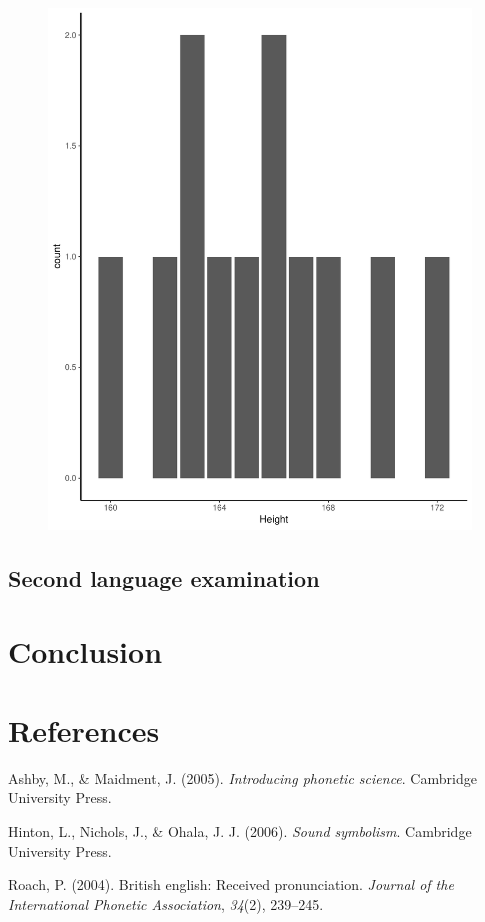 \documentclass[man, fleqn, noextraspace]{apa6}
\begin{document}
\begin{figure}
\centering
\includegraphics{Vowel_v2_files/figure-latex/figure6-1.pdf}
\caption{}
\end{figure}

\subsection{Second language
examination}\label{second-language-examination}

\section{Conclusion}\label{conclusion}

\newpage

\section{References}\label{references}

\begingroup
\setlength{\parindent}{-0.5in} \setlength{\leftskip}{0.5in}

\hypertarget{refs}{}
\hypertarget{ref-ashby2005}{}
Ashby, M., \& Maidment, J. (2005). \emph{Introducing phonetic science}.
Cambridge University Press.

\hypertarget{ref-hinton2006}{}
Hinton, L., Nichols, J., \& Ohala, J. J. (2006). \emph{Sound symbolism}.
Cambridge University Press.

\hypertarget{ref-roach2004}{}
Roach, P. (2004). British english: Received pronunciation. \emph{Journal
of the International Phonetic Association}, \emph{34}(2), 239--245.

\endgroup
\end{document}
